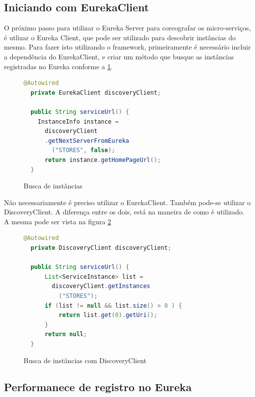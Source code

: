 \documentclass[journal]{IEEEtran}
\begin{document}
\subsection{Iniciando com EurekaClient}

O próximo passo para utilizar o Eureka Server para coreografar os micro-serviços, é utlizar o Eureka Client, que pode ser utilizado para descobrir instâncias do mesmo. Para fazer isto utilizando o framework, primeiramente é necessário incluir a dependência do EurekaClient, e criar um método que busque as instâncias registradas no Eureka conforme a \ref{alg:figuraquatro}.


\begin{figure}[h]
\centering

\begin{lstlisting}[language=Java]
  @Autowired
  private EurekaClient discoveryClient;

  public String serviceUrl() {
    InstanceInfo instance = 
      discoveryClient
      .getNextServerFromEureka
        ("STORES", false);
      return instance.getHomePageUrl();
  } 
\end{lstlisting}

\caption{Busca de instâncias}
\label{alg:figuraquatro}
\end{figure}

Não necessariamente é preciso utilizar o EurekaClient. Também pode-se utilizar o DiscoveryClient. A diferença entre os dois, está na maneira de como é utilizado. A mesma pode ser vista na figura \ref{alg:figuracinco}

\begin{figure}[h]
\centering

\begin{lstlisting}[language=Java]
  @Autowired
  private DiscoveryClient discoveryClient;

  public String serviceUrl() {
      List<ServiceInstance> list = 
        discoveryClient.getInstances
          ("STORES");
      if (list != null && list.size() > 0 ) {
          return list.get(0).getUri();
      }
      return null;
  }
\end{lstlisting}

\caption{Busca de instâncias com DiscoveryClient}
\label{alg:figuracinco}
\end{figure}

\subsection{Performanece de registro no Eureka}
\end{document}
